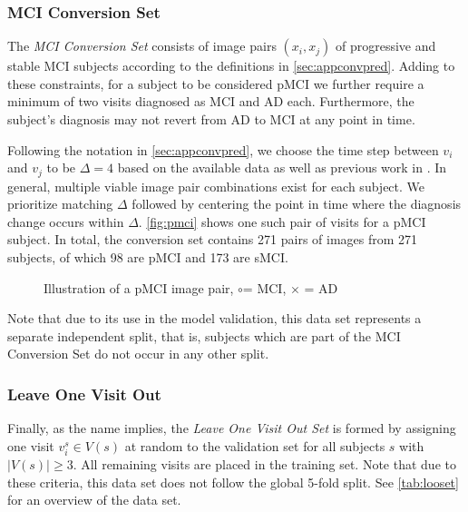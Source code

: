 \subsubsection*{MCI Conversion Set} \label{sec:datconv}
The \textit{MCI Conversion Set} consists of image pairs $(x_i, x_j)$ of progressive and stable MCI subjects according to the definitions in \autoref{sec:appconvpred}. Adding to these constraints, for a subject to be considered pMCI we further require a minimum of two visits diagnosed as MCI and AD each. Furthermore, the subject's diagnosis may not revert from AD to MCI at any point in time.

Following the notation in \ref{sec:appconvpred}, we choose the time step between $v_i$ and $v_j$ to be $\Delta = 4$ based on the available data as well as previous work in \cite{wegmayr}. In general, multiple viable image pair combinations exist for each subject. We prioritize matching $\Delta$ followed by centering the point in time where the diagnosis change occurs within $\Delta$. \autoref{fig:pmci} shows one such pair of visits for a pMCI subject. In total, the conversion set contains 271 pairs of images from 271 subjects, of which 98 are pMCI and 173 are sMCI.

\begin{figure}[h]
	\centering
	
	\caption{Illustration of a pMCI image pair, \Large$\circ$\normalsize\;= MCI, $\times$ = AD}
	\label{fig:pmci}
\end{figure}

Note that due to its use in the model validation, this data set represents a separate independent split, that is, subjects which are part of the MCI Conversion Set do not occur in any other split.

\subsubsection*{Leave One Visit Out} \label{sec:datloo}
Finally, as the name implies, the \textit{Leave One Visit Out Set} is formed by assigning one visit $v^s_i \in V(s)$ at random to the validation set for all subjects $s$ with $ | V(s) | \ge 3 $. All remaining visits are placed in the training set. Note that due to these criteria, this data set does not follow the global 5-fold split. See \autoref{tab:looset} for an overview of the data set.


